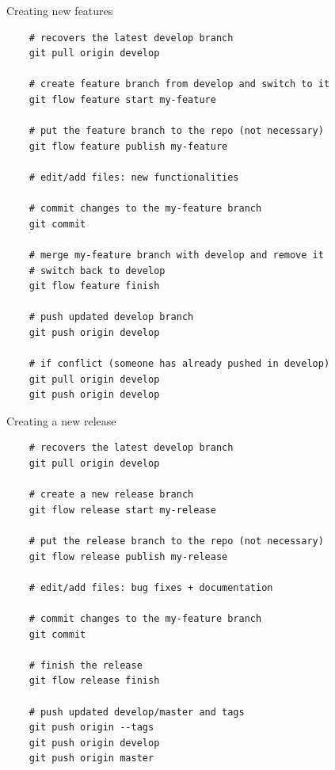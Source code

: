 \documentclass[svgnames]{beamer}
\begin{document}
\begin{frame}[fragile]{Creating new features}

    \begin{lstlisting}
    # recovers the latest develop branch
    git pull origin develop

    # create feature branch from develop and switch to it
    git flow feature start my-feature 

    # put the feature branch to the repo (not necessary)
    git flow feature publish my-feature 

    # edit/add files: new functionalities

    # commit changes to the my-feature branch
    git commit 

    # merge my-feature branch with develop and remove it
    # switch back to develop
    git flow feature finish

    # push updated develop branch
    git push origin develop

    # if conflict (someone has already pushed in develop)
    git pull origin develop
    git push origin develop
    \end{lstlisting}

\end{frame}

\begin{frame}[fragile]{Creating a new release}

    \begin{lstlisting}
    # recovers the latest develop branch
    git pull origin develop

    # create a new release branch
    git flow release start my-release

    # put the release branch to the repo (not necessary)
    git flow release publish my-release 

    # edit/add files: bug fixes + documentation

    # commit changes to the my-feature branch
    git commit 

    # finish the release
    git flow release finish

    # push updated develop/master and tags
    git push origin --tags
    git push origin develop
    git push origin master
    \end{lstlisting}
\end{frame}
\end{document}
